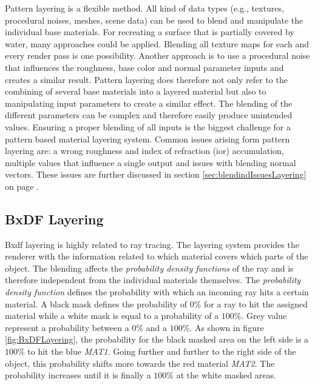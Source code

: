 	Pattern layering is a flexible method. All kind of data types (e.g., textures, procedural noises, meshes, scene data) can be used to blend and manipulate the individual base materials. For recreating a surface that is partially covered by water, many approaches could be applied. Blending all texture maps for each and every render pass is one possibility. Another approach is to use a procedural noise that influences the roughness, base color and normal parameter inputs and creates a similar result. Pattern layering does therefore not only refer to the combining of several base materials into a layered material but also to manipulating input parameters to create a similar effect. The blending of the different parameters can be complex and therefore easily produce unintended values. Ensuring a proper blending of all inputs is the biggest challenge for a pattern based material layering system. Common issues arising form pattern layering are: a wrong roughness and index of refraction (ior) accumulation, multiple values that influence a single output and issues with blending normal vectors. These issues are further discussed in section \ref{sec:blendindIssuesLayering} on page \pageref{sec:blendindIssuesLayering}.
	

	\subsection{BxDF Layering}\label{sec:BxDFLayering}


	Bxdf layering is highly related to ray tracing. The layering system provides the renderer with the information related to which material covers which parts of the object. The blending affects the \emph{probability density functions} of the ray and is therefore independent from the individual materials themselves. The \emph{probability density function} defines the probability with which an incoming ray hits a certain material. A black mask defines the probability of $0\%$ for a ray to hit the assigned material while a white mask is equal to a probability of a $100\%$. Grey value represent a probability between a $0\%$ and a $100\%$. As shown in figure \ref{fig:BxDFLayering}, the probability for the black masked area on the left side is a $100\%$ to hit the blue \emph{MAT1}. Going further and further to the right side of the object, this probability shifts more towards the red material \emph{MAT2}. The probability increases until it is finally a $100\%$ at the white masked areas.
	
